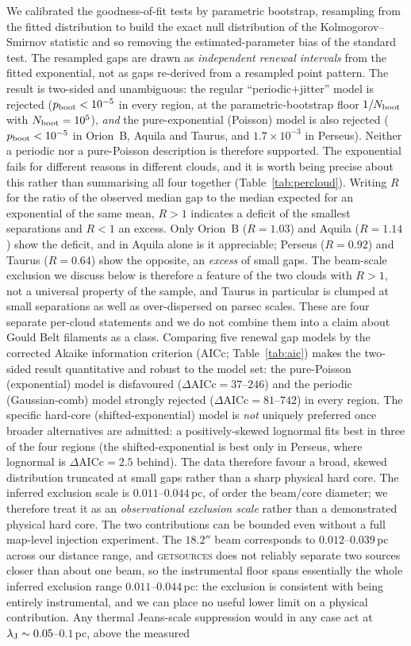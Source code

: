 \documentclass[usenatbib,twoside,twocolumn]{mnras}
\begin{document}
We calibrated the goodness-of-fit tests by parametric bootstrap, resampling from the fitted distribution to build the exact null distribution of the Kolmogorov--Smirnov statistic and so removing the estimated-parameter bias of the standard test. The resampled gaps are drawn as \emph{independent renewal intervals} from the fitted exponential, not as gaps re-derived from a resampled point pattern. The result is two-sided and unambiguous: the regular ``periodic$+$jitter'' model is rejected ($p_{\rm boot}<10^{-5}$ in every region, at the parametric-bootstrap floor $1/N_{\rm boot}$ with $N_{\rm boot}=10^5$), \emph{and} the pure-exponential (Poisson) model is also rejected ($p_{\rm boot}<10^{-5}$ in Orion~B, Aquila and Taurus, and $1.7\times10^{-3}$ in Perseus). Neither a periodic nor a pure-Poisson description is therefore supported. The exponential fails for different reasons in different clouds, and it is worth being precise about this rather than summarising all four together (Table~\ref{tab:percloud}). Writing $R$ for the ratio of the observed median gap to the median expected for an exponential of the same mean, $R>1$ indicates a deficit of the smallest separations and $R<1$ an excess. Only Orion~B ($R=1.03$) and Aquila ($R=1.14$) show the deficit, and in Aquila alone is it appreciable; Perseus ($R=0.92$) and Taurus ($R=0.64$) show the opposite, an \emph{excess} of small gaps. The beam-scale exclusion we discuss below is therefore a feature of the two clouds with $R>1$, not a universal property of the sample, and Taurus in particular is clumped at small separations as well as over-dispersed on parsec scales. These are four separate per-cloud statements and we do not combine them into a claim about Gould Belt filaments as a class. Comparing five renewal gap models by the corrected Akaike information criterion (AICc; Table~\ref{tab:aic}) makes the two-sided result quantitative and robust to the model set: the pure-Poisson (exponential) model is disfavoured ($\Delta$AICc$=37$--$246$) and the periodic (Gaussian-comb) model strongly rejected ($\Delta$AICc$=81$--$742$) in every region. The specific hard-core (shifted-exponential) model is \emph{not} uniquely preferred once broader alternatives are admitted: a positively-skewed lognormal fits best in three of the four regions (the shifted-exponential is best only in Perseus, where lognormal is $\Delta$AICc$=2.5$ behind). The data therefore favour a broad, skewed distribution truncated at small gaps rather than a sharp physical hard core. The inferred exclusion scale is $0.011$--$0.044$\,pc, of order the beam/core diameter; we therefore treat it as an \emph{observational exclusion scale} rather than a demonstrated physical hard core. The two contributions can be bounded even without a full map-level injection experiment. The $18.2''$ beam corresponds to $0.012$--$0.039$\,pc across our distance range, and \textsc{getsources} does not reliably separate two sources closer than about one beam, so the instrumental floor spans essentially the whole inferred exclusion range $0.011$--$0.044$\,pc: the exclusion is consistent with being entirely instrumental, and we can place no useful lower limit on a physical contribution. Any thermal Jeans-scale suppression would in any case act at $\lambda_{\rm J}\sim0.05$--$0.1$\,pc, above the measured 
\end{document}
